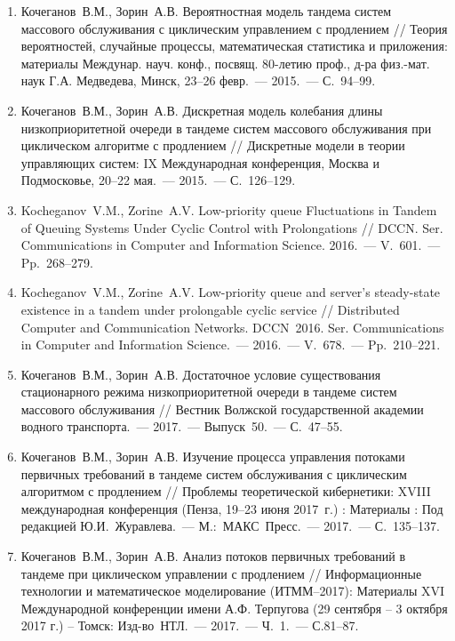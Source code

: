 \documentclass[14pt]{extarticle}
\theoremstyle{theorem}
\theoremstyle{remark}
\begin{document}
    \begin{enumerate}

   \item Кочеганов~В.М., Зорин~А.В. Вероятностная модель тандема систем массового обслуживания с циклическим управлением с продлением // Теория вероятностей, случайные процессы, математическая статистика и приложения: материалы Междунар. науч. конф., посвящ. 80-летию проф., д-ра физ.-мат. наук Г.А. Медведева, Минск, 23–26 февр.~--- 2015.~--- С.~94--99.
\item Кочеганов~В.М., Зорин~А.В. Дискретная модель колебания длины низкоприоритетной очереди в тандеме систем массового обслуживания при циклическом алгоритме с продлением // Дискретные модели в теории управляющих систем: IX Международная конференция, Москва и Подмосковье, 20–22 мая.~--- 2015.~--- С.~126--129.


\item
Kocheganov~V.M., Zorine~A.V. Low-priority queue Fluctuations in Tandem of Queuing Systems Under Cyclic Control with Prolongations // DCCN. Ser. Communications in Computer and Information Science. 2016.~--- V.~601.~--- Pp.~268--279.

\item  Kocheganov~V.M., Zorine~A.V. Low-priority queue and server's steady-state existence in a tandem under prolongable cyclic service // Distributed Computer and Communication Networks. DCCN~2016. Ser. Communications in Computer and Information Science.~--- 2016.~--- V.~678.~--- Pp.~210--221.


\item Кочеганов~В.М., Зорин~А.В. Достаточное условие существования стационарного режима низкоприоритетной очереди в тандеме систем массового обслуживания // Вестник Волжской государственной академии водного транспорта.~--- 2017.~--- Выпуск~50.~--- С.~47--55.

\item 
Кочеганов~В.М., Зорин~А.В. Изучение процесса управления потоками первичных требований в тандеме систем обслуживания с циклическим алгоритмом с продлением // Проблемы теоретической кибернетики: XVIII международная конференция (Пенза, 19--23 июня 2017~г.) : Материалы : Под редакцией Ю.И.~Журавлева.~--- М.:~МАКС~Пресс.~--- 2017.~--- С.~135--137.

\item 
Кочеганов~В.М., Зорин~А.В. Анализ потоков первичных требований в тандеме при циклическом управлении с продлением // Информационные технологии и математическое моделирование (ИТММ--2017): Материалы XVI Международной конференции имени А.Ф. Терпугова (29 сентября -- 3 октября 2017 г.) -- Томск: Изд-во~НТЛ.~--- 2017.~--- Ч.~1.~--- С.81--87.


\end{enumerate}
\end{document}
